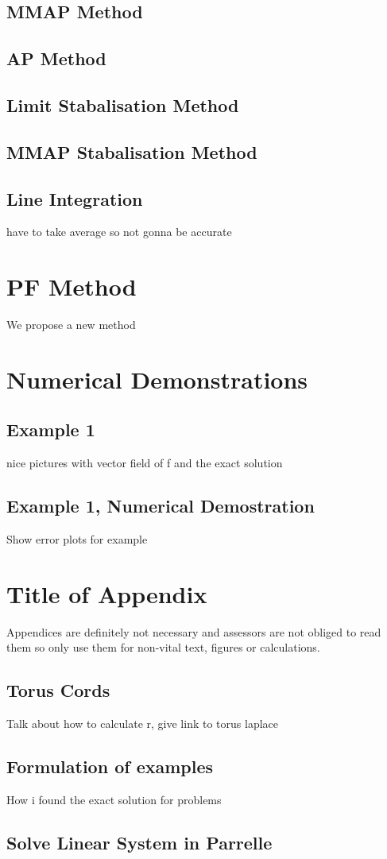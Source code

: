 \documentclass[12pt,a4paper]{article}
\begin{document}
\subsection{MMAP Method}

\subsection{AP Method}

\subsection{Limit Stabalisation Method}

\subsection{MMAP Stabalisation Method}

\subsection{Line Integration}
have to take average so not gonna be accurate

\section{PF Method}
We propose a new method 


\section{Numerical Demonstrations}
\subsection{Example 1}
nice pictures with vector field
of f and the exact solution

\subsection{Example 1, Numerical Demostration}
Show error plots for example

\printbibliography[heading=bibintoc]

\appendix

\section{Title of Appendix}

Appendices are definitely not necessary and assessors are not obliged to read them so only use them for non-vital text, figures or calculations.

\subsection{Torus Cords}
Talk about how to calculate r, give link to torus laplace 

\subsection{Formulation of examples}
How i found the exact solution for problems 

\subsection{Solve Linear System in Parrelle}
\end{document}
